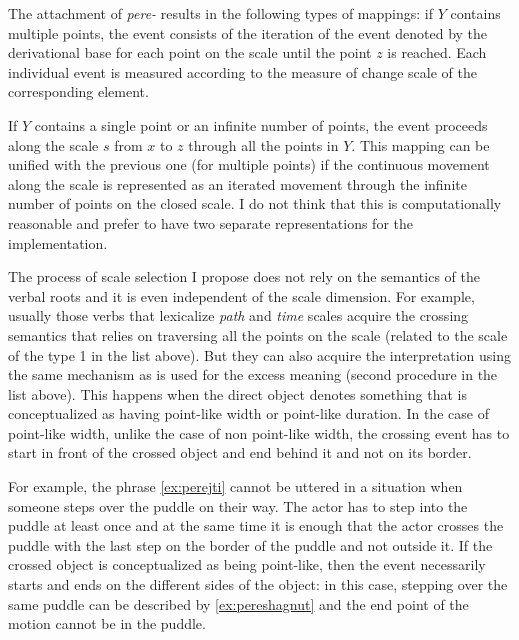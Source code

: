 The attachment of \textit{pere-}   results in the following types of mappings: %
if $Y$ contains multiple points, the event consists of the iteration of the event denoted by the derivational base for each point on the scale until the point $z$ is reached. Each individual event is measured according to the measure of change scale of the corresponding element.

If $Y$ contains a single point or an infinite number of points, the event proceeds along the scale $s$ from $x$ to $z$ through all the points in $Y$. This mapping can be unified with the previous one (for multiple points) if the continuous movement along the scale is represented as an iterated movement through the infinite number of points on the closed scale. I do not think that this is computationally reasonable and prefer to have two separate representations for the implementation.

The process of scale selection I propose does not rely on the semantics of the verbal roots and it is even independent of the scale dimension. For example, usually those verbs that lexicalize \textit{path} and \textit{time} scales acquire the crossing semantics that relies on traversing all the points on the scale (related to the scale of the type 1 in the list above). But they can also acquire the interpretation using the same mechanism as is used for the excess  meaning (second procedure in the list above). This happens when the direct object denotes something that is conceptualized as having point-like width or point-like duration. In the case of point-like width, unlike the case of non point-like width, the crossing event has to start in front of the crossed object and end behind it and not on its border.

For example, the phrase \ref{ex:perejti} cannot be uttered in a situation when someone steps over the puddle on their way. The actor has to step into the puddle at least once and at the same time it is enough that the actor crosses the puddle with the last step on the border of the puddle and not outside it. If the crossed object is conceptualized as being point-like, then the event necessarily starts and ends on the different sides of the object: in this case, stepping over the same puddle can be described by \ref{ex:pereshagnut} and the end point of the motion cannot be in the puddle.

